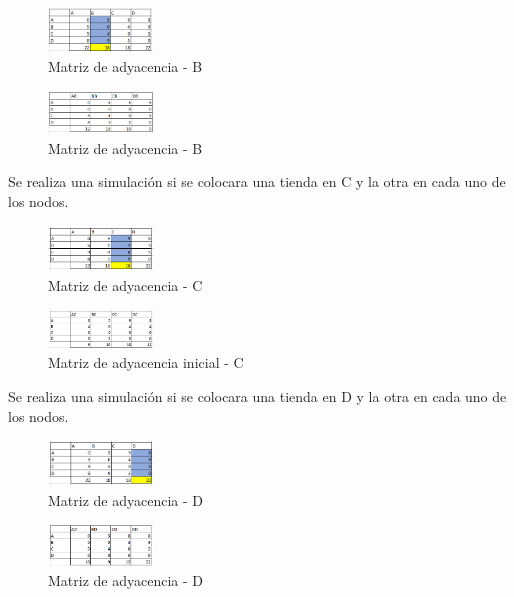 \documentclass[conference,compsoc]{IEEEtran}
\begin{document}
\begin{figure}[h]
    \centering
    \includegraphics[width=0.25\textwidth]{Problema1/p111.png}
    \caption{Matriz de adyacencia - B}
    \label{fig:mesh1}
\end{figure}
\begin{figure}[h]
    \centering
    \includegraphics[width=0.25\textwidth]{Problema1/p112.png}
    \caption{Matriz de adyacencia - B}
    \label{fig:mesh1}
\end{figure}
$$$$$$$$
Se realiza una simulación si se colocara una tienda en C y la otra en cada uno de los nodos.
$$$$
\begin{figure}[h]
    \centering
    \includegraphics[width=0.25\textwidth]{Problema1/p113.png}
    \caption{Matriz de adyacencia - C}
    \label{fig:mesh1}
\end{figure}
\begin{figure}[h]
    \centering
    \includegraphics[width=0.25\textwidth]{Problema1/p114.png}
    \caption{Matriz de adyacencia inicial - C}
    \label{fig:mesh1}
\end{figure}
$$$$$$$$$$$$$$$$
Se realiza una simulación si se colocara una tienda en D y la otra en cada uno de los nodos.
$$$$$$$$$$$$
\begin{figure}[h]
    \centering
    \includegraphics[width=0.25\textwidth]{Problema1/p115.png}
    \caption{Matriz de adyacencia - D}
    \label{fig:mesh1}
\end{figure}
\begin{figure}[h]
    \centering
    \includegraphics[width=0.25\textwidth]{Problema1/p116.png}
    \caption{Matriz de adyacencia - D}
    \label{fig:mesh1}
\end{figure}
\end{document}
